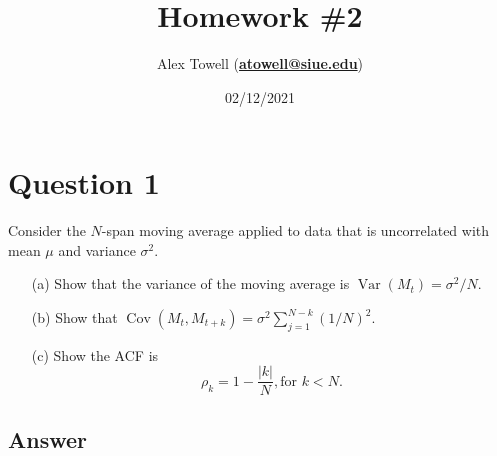 \documentclass[10pt]{fphw}
\title{Homework \#2} %
\author{Alex Towell (\href{mailto:atowell@siue.edu}{\bfseries{atowell@siue.edu}})}
\date{02/12/2021} %
\institute{Southern Illinois University-Edwardsville}
\theoremstyle{definition}
\newcommand{\var}{\operatorname{Var}}
\newcommand{\cov}{\operatorname{Cov}}
\begin{document}
\maketitle %
\section*{Question 1}
\begin{problem}
Consider the $N$-span moving average applied to data that is uncorrelated with mean $\mu$ and
variance $\sigma^2$.
\begin{enumerate}
\item[(a)] Show that the variance of the moving average is $\var(M_t) = \sigma^2 /N$.
\item[(b)] Show that $\cov(M_t , M_{t+k}) = \sigma^2
\sum_{j=1}^{N-k}(1/N)^2$.
\item[(c)] Show the ACF is
\begin{equation*}
\rho_k = 1 - \frac{|k|}{N}, \text{for $k < N$.}
\end{equation*}
\end{enumerate}
\end{problem}

\subsection*{Answer}
\end{document}
